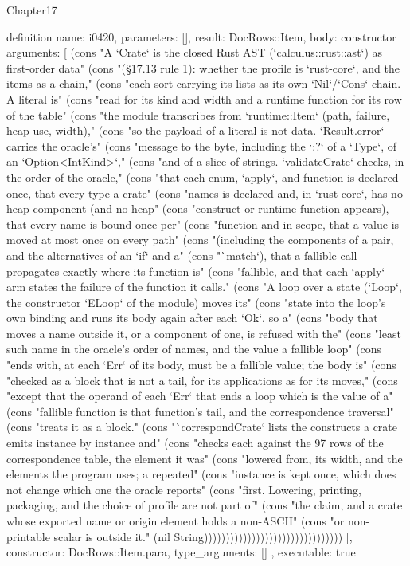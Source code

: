 \begin{lexlean}{Chapter17}
\begin{semanticmodule}
definition{
  name: i0420,
  parameters: [],
  result: DocRows::Item,
  body: constructor{
    arguments: [
      (cons "A `Crate` is the closed Rust AST (`calculus::rust::ast`) as first-order data" (cons "(§17.13 rule 1): whether the profile is `rust-core`, and the items as a chain," (cons "each sort carrying its lists as its own `Nil`/`Cons` chain. A literal is" (cons "read for its kind and width and a runtime function for its row of the table" (cons "the module transcribes from `runtime::Item` (path, failure, heap use, width)," (cons "so the payload of a literal is not data. `Result.error` carries the oracle's" (cons "message to the byte, including the `{:?}` of a `Type`, of an `Option<IntKind>`," (cons "and of a slice of strings. `validateCrate` checks, in the order of the oracle," (cons "that each enum, `apply`, and function is declared once, that every type a crate" (cons "names is declared and, in `rust-core`, has no heap component (and no heap" (cons "construct or runtime function appears), that every name is bound once per" (cons "function and in scope, that a value is moved at most once on every path" (cons "(including the components of a pair, and the alternatives of an `if` and a" (cons "`match`), that a fallible call propagates exactly where its function is" (cons "fallible, and that each `apply` arm states the failure of the function it calls." (cons "A loop over a state (`Loop`, the constructor `ELoop` of the module) moves its" (cons "state into the loop's own binding and runs its body again after each `Ok`, so a" (cons "body that moves a name outside it, or a component of one, is refused with the" (cons "least such name in the oracle's order of names, and the value a fallible loop" (cons "ends with, at each `Err` of its body, must be a fallible value; the body is" (cons "checked as a block that is not a tail, for its applications as for its moves," (cons "except that the operand of each `Err` that ends a loop which is the value of a" (cons "fallible function is that function's tail, and the correspondence traversal" (cons "treats it as a block." (cons "`correspondCrate` lists the constructs a crate emits instance by instance and" (cons "checks each against the 97 rows of the correspondence table, the element it was" (cons "lowered from, its width, and the elements the program uses; a repeated" (cons "instance is kept once, which does not change which one the oracle reports" (cons "first. Lowering, printing, packaging, and the choice of profile are not part of" (cons "the claim, and a crate whose exported name or origin element holds a non-ASCII" (cons "or non-printable scalar is outside it." (nil String))))))))))))))))))))))))))))))))
    ],
    constructor: DocRows::Item.para,
    type_arguments: []
  },
  executable: true
}


\end{semanticmodule}
\end{lexlean}
